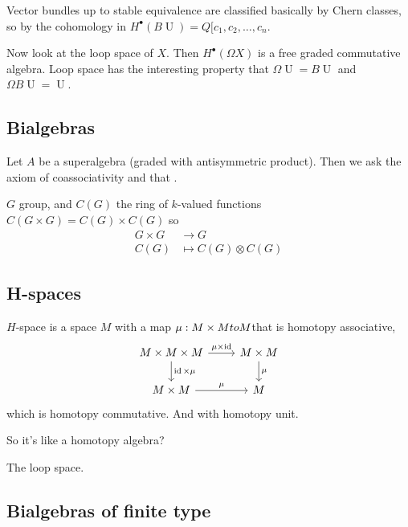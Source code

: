 Vector bundles up to stable equivalence are classified basically by Chern classes, so by the cohomology in $H^\bullet(B\operatorname{U})=Q[c_1,c_2,\ldots,c_n$.

Now look at the loop space of $X$. Then $H^{\bullet}(\Omega X)$ is a free graded commutative algebra. Loop space has the interesting property that $\Omega \operatorname{U}=B\operatorname{U}$ and $\Omega B\operatorname{U}=\operatorname{U}$.

\subsection{Bialgebras}

Let $A$ be a superalgebra (graded with antisymmetric product). Then we ask the axiom of coassociativity and that .

\begin{example}
	$G$ group, and $C(G)$ the ring of  $k$-valued functions $C(G\times G)=C(G)\times C(G)$ so
	\begin{align*}
		G\times G &\longrightarrow G \\
		C(G) &\longmapsto C(G)\otimes C(G)
	\end{align*}
	
\end{example}

\subsection{H-spaces}

\begin{defn}
	$H$-space is a space $M$ with a map $\mu:M\times M\\to M$that is homotopy associative,
	\[\begin{tikzcd}
		M\times M\times M\arrow[r,"\mu\times \operatorname{id}"]\arrow[d,"\operatorname{id}\times \mu"]&M\times M\arrow[d,"\mu"]\\
		M\times M\arrow[r,"\mu"]&M
	\end{tikzcd}\]
	which is homotopy commutative. And with homotopy unit.
\end{defn}

So it's like a homotopy algebra?

\begin{example}
	The loop space.
\end{example}

\subsection{Bialgebras of finite type}

